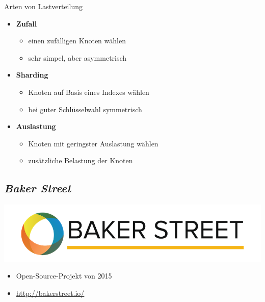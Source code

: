 \documentclass{beamer}
\begin{document}
\begin{frame}{Arten von Lastverteilung}
	\begin{itemize}[<+->]
		\item \textbf{Zufall} 
		\begin{itemize}
			\item einen zufälligen Knoten wählen
			\item sehr simpel, aber asymmetrisch
		\end{itemize}
		\item \textbf{Sharding} 
		\begin{itemize}
			\item Knoten auf Basis eines Indexes wählen
			\item bei guter Schlüsselwahl symmetrisch
		\end{itemize}
		\item \textbf{Auslastung} 
		\begin{itemize}
			\item Knoten mit geringster Auslastung wählen
			\item zusätzliche Belastung der Knoten
		\end{itemize}
	\end{itemize}
\end{frame}

\subsection{\em Baker Street}
\begin{frame}{\insertsubsection}
	\centering
	\includegraphics[width=\linewidth]{img/bakerstreet}
	\begin{itemize}
		\item Open-Source-Projekt von 2015
		\item \url{http://bakerstreet.io/}
	\end{itemize}
\end{frame}
\end{document}
